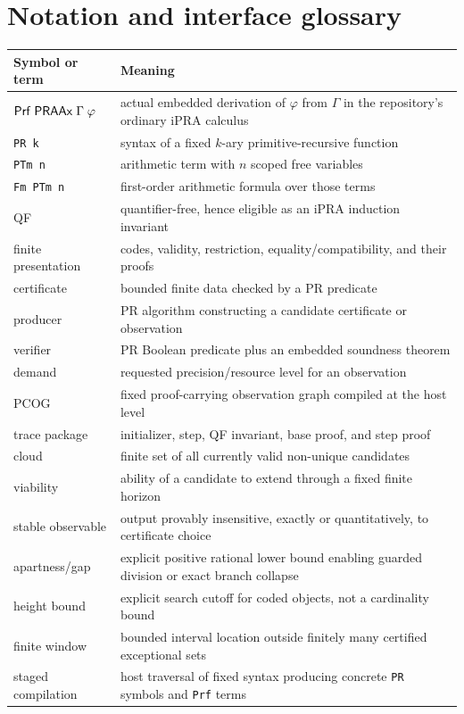 \section{Notation and interface glossary}
\label{app:notation}

\begin{longtable}{@{}p{}p{}@{}}
\toprule
Symbol or term & Meaning \\
\midrule
\endhead
\(\mathsf{Prf}\;\mathsf{PRAAx}\;\Gamma\;\varphi\) & actual embedded derivation of \(\varphi\)
from \(\Gamma\) in the repository's ordinary iPRA calculus \\
\texttt{PR k} & syntax of a fixed \(k\)-ary primitive-recursive function \\
\texttt{PTm n} & arithmetic term with \(n\) scoped free variables \\
\texttt{Fm PTm n} & first-order arithmetic formula over those terms \\
QF & quantifier-free, hence eligible as an iPRA induction invariant \\
finite presentation & codes, validity, restriction, equality/compatibility,
and their proofs \\
certificate & bounded finite data checked by a PR predicate \\
producer & PR algorithm constructing a candidate certificate or observation \\
verifier & PR Boolean predicate plus an embedded soundness theorem \\
demand & requested precision/resource level for an observation \\
PCOG & fixed proof-carrying observation graph compiled at the host level \\
trace package & initializer, step, QF invariant, base proof, and step proof \\
cloud & finite set of all currently valid non-unique candidates \\
viability & ability of a candidate to extend through a fixed finite horizon \\
stable observable & output provably insensitive, exactly or quantitatively, to
certificate choice \\
apartness/gap & explicit positive rational lower bound enabling guarded
division or exact branch collapse \\
height bound & explicit search cutoff for coded objects, not a cardinality bound \\
finite window & bounded interval location outside finitely many certified
exceptional sets \\
staged compilation & host traversal of fixed syntax producing concrete
\texttt{PR} symbols and \texttt{Prf} terms \\
\bottomrule
\end{longtable}

